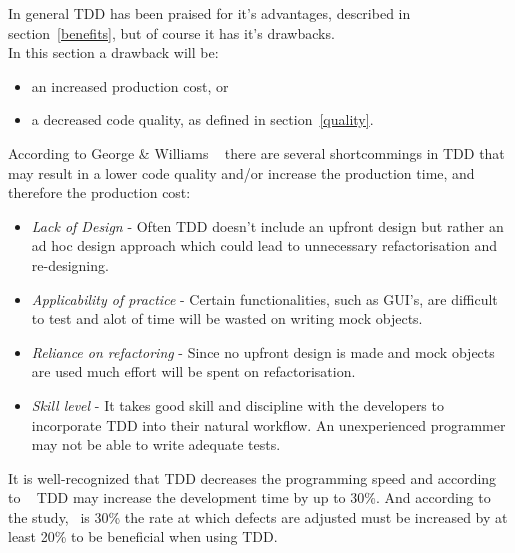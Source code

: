 In general TDD has been praised for it's advantages, described in section~\ref{benefits}, but of course it has it's drawbacks.\\

\noindent In this section a drawback will be:
\begin{itemize}
\item an increased production cost, or
\item a decreased code quality, as defined in section~\ref{quality}.
\end{itemize}

According to George \& Williams ~\cite{georgeandwilliams} there are several shortcommings in TDD that may result in a lower code quality and/or increase the production time, and therefore the production cost:
\begin{itemize}
 \item \textit{Lack of Design} - Often TDD doesn't include an upfront design but rather an ad hoc design approach which could lead to unnecessary refactorisation and re-designing. 
 \item \textit{Applicability of practice} - Certain functionalities, such as GUI's, are difficult to test and alot of time will be wasted on writing mock objects.
 \item \textit{Reliance on refactoring} - Since no upfront design is made and mock objects are used much effort will be spent on refactorisation.
 \item \textit{Skill level} - It takes good skill and discipline with the developers to incorporate TDD into their natural workflow. An unexperienced programmer may not be able to write adequate tests.\\
\end{itemize}

\noindent It is well-recognized that TDD decreases the programming speed and according to ~\cite{microsoftibm} TDD may increase the development time by up to 30\%. 
And according to the study,~\cite{tddroi} is 30\% the rate at which defects are adjusted must be increased by at least 20\% to be beneficial when using TDD.
